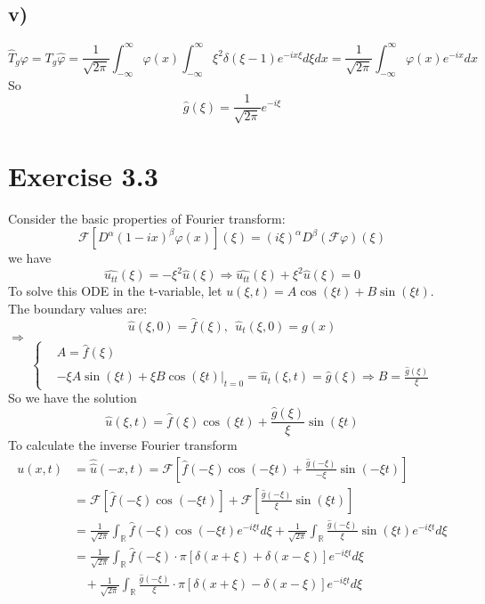 \documentclass[a4paper, 11pt]{article}
\begin{document}
\begin{spacing}{1.5}
\subsection*{v)}
$$
\hat{T}_g \varphi = T_g \hat{\varphi} = \frac{1}{\sqrt{2\pi}} \int_{-\infty}^{\infty} \varphi(x) \int_{-\infty}^{\infty} \xi^2 \delta(\xi-1) e^{-ix\xi} d\xi dx = \frac{1}{\sqrt{2\pi}}\int_{-\infty}^{\infty} \varphi(x) e^{-ix} dx
$$
So
$$
\hat{g} (\xi) = \frac{1}{\sqrt{2\pi}} e^{-i\xi}
$$


\section*{Exercise 3.3}
Consider the basic properties of Fourier transform:
$$
\mathcal{F} \left[ D^\alpha (1- ix)^\beta \varphi(x) \right] (\xi) = (i\xi) ^\alpha D^\beta (\mathcal{F} \varphi) (\xi)
$$
we have
$$
\widehat{u_{tt} } (\xi) = -\xi^2 \hat{u} (\xi) \Rightarrow \widehat{u_{tt} } (\xi) + \xi^2 \hat{u } (\xi) =0
$$
To solve this ODE in the t-variable, let $u(\xi,t) = A\cos(\xi t) + B\sin(\xi t)$. The boundary values are:
$$
\hat{u} (\xi, 0) = \hat{f} (\xi), \ \ \hat{u} _t (\xi,0) =g(x)
$$
$\Rightarrow$
$$
\left\{
\begin{aligned}
& A = \hat{f} (\xi)  \\
& -\xi A \sin(\xi t) + \xi B \cos(\xi t) \Big|_{t=0} = \hat{u} _t(\xi, t) = \hat{g} (\xi)\Rightarrow B = \frac{\hat{g}(\xi)}{\xi}
\end{aligned}
\right.
$$
So we have the solution
$$
\hat{u} (\xi,t) = \hat{f}  (\xi) \cos(\xi t) + \frac{\hat{g}(\xi)}{\xi} \sin(\xi t)
$$
To calculate the inverse Fourier transform
\begin{align*}
u(x,t) 
	&= \hat{\hat{u}}(-x,t) = \mathcal{F}\left[ \hat{f} (-\xi) \cos(-\xi t) + \frac{\hat{g}(-\xi)}{-\xi}\sin(-\xi t) \right] \\
	& = \mathcal{F}\left[ \hat{f} (-\xi) \cos(-\xi t)\right] + \mathcal{F}\left[ \frac{\hat{g}(-\xi)}{\xi}\sin(\xi t) \right] \\
	& = \frac{1}{\sqrt{2\pi}} \int_{\mathbb{R}} \hat{f} (-\xi) \cos(-\xi t) e^{-i\xi t} d\xi + \frac{1}{\sqrt{2\pi}} \int_{\mathbb{R}} \frac{\hat{g}(-\xi)}{\xi}\sin(\xi t) e^{-i\xi t} d\xi \\
	& = \frac{1}{\sqrt{2\pi}}  \int_{\mathbb{R}} \hat{f} (-\xi) \cdot \pi \left[ \delta(x+\xi) + \delta(x-\xi) \right] e^{-i\xi t} d\xi \\
	& \ \ \ \ + \frac{1}{\sqrt{2\pi}}  \int_{\mathbb{R}} \frac{\hat{g}(-\xi)}{\xi} \cdot \pi \left[ \delta(x+\xi) - \delta(x-\xi) \right] e^{-i\xi t} d\xi
\end{align*}







\end{spacing}
\end{document}

